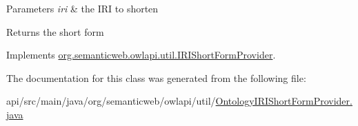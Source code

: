 \begin{DoxyParams}{Parameters}
{\em iri} & the I\-R\-I to shorten \\
\hline
\end{DoxyParams}
\begin{DoxyReturn}{Returns}
the short form 
\end{DoxyReturn}


Implements \hyperlink{interfaceorg_1_1semanticweb_1_1owlapi_1_1util_1_1_i_r_i_short_form_provider_ab86f83930304cc46d46e858f6172c1fb}{org.\-semanticweb.\-owlapi.\-util.\-I\-R\-I\-Short\-Form\-Provider}.



The documentation for this class was generated from the following file\-:\begin{DoxyCompactItemize}
\item 
api/src/main/java/org/semanticweb/owlapi/util/\hyperlink{_ontology_i_r_i_short_form_provider_8java}{Ontology\-I\-R\-I\-Short\-Form\-Provider.\-java}\end{DoxyCompactItemize}

